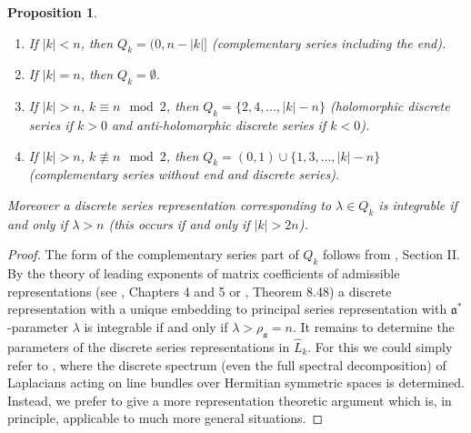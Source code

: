 \documentclass[10]{amsart}
\newtheorem{pro}[thm]{Proposition}
\theoremstyle{remark}
\theoremstyle{definition}
\numberwithin{equation}{section}
\newcommand{\fa}{{\mathfrak a}}             %
\begin{document}
{\begin{pro}\label{crux}\mbox{}
\begin{enumerate}
\item If $|k|<n$, then $Q_k=(0,n-|k|]$ (complementary series including the end).
\item If $|k|=n$, then $Q_k=\emptyset$.
\item If $|k|> n$, $k\equiv n \mod 2$, then $Q_k=\{2,4,\dots,|k|-n\}$ (holomorphic discrete series if $k>0$ and anti-holomorphic discrete series if $k<0$).
\item If $|k|> n$, $k\not\equiv n \mod 2$, then $Q_k=(0,1)\cup\{1,3,\dots,|k|-n\}$ (complementary series without end and discrete series).
\end{enumerate}
Moreover a discrete series representation corresponding to $\lambda\in Q_k$ is integrable if and only if
$\lambda>n$ (this occurs if and only if $|k|>2n$).
\end{pro}
\begin{proof}
The form of the complementary series part of $Q_k$ follows from \cite{KnS71}, Section II. 
By the theory of leading exponents of matrix coefficients of admissible representations (see \cite{Wa88}, Chapters 4 and 5 or \cite{Kn86}, Theorem 8.48) a 
discrete representation with a unique embedding to principal series representation with $\fa^*$-parameter $\lambda$ is integrable if and only if 
$\lambda>\rho_\fa=n$. It remains to determine the parameters of the discrete series representations in $\widehat L_k$. For this we could simply refer to \cite{Sh94}, 
where the discrete spectrum (even the full spectral decomposition) of Laplacians acting on line bundles over Hermitian symmetric spaces is determined. Instead, we prefer 
to give a more representation theoretic argument which is, in principle, applicable to much more general situations.


\end{proof}}
\end{document}
